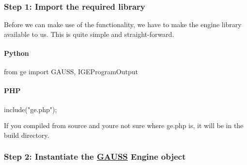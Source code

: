 

\subsubsection*{Step 1\+: Import the required library}

Before we can make use of the functionality, we have to make the engine library available to us. This is quite simple and straight-\/forward.

\paragraph*{Python}


\begin{DoxyCode}
\textcolor{keyword}{from} ge \textcolor{keyword}{import} GAUSS, IGEProgramOutput
\end{DoxyCode}


\paragraph*{P\+HP}


\begin{DoxyCode}
include(\textcolor{stringliteral}{"ge.php"});
\end{DoxyCode}


If you compiled from source and you\textquotesingle{}re not sure where {\ttfamily ge.\+php} is, it will be in the {\ttfamily build} directory.

\subsubsection*{Step 2\+: Instantiate the \hyperlink{class_g_a_u_s_s}{G\+A\+U\+SS} Engine object}

